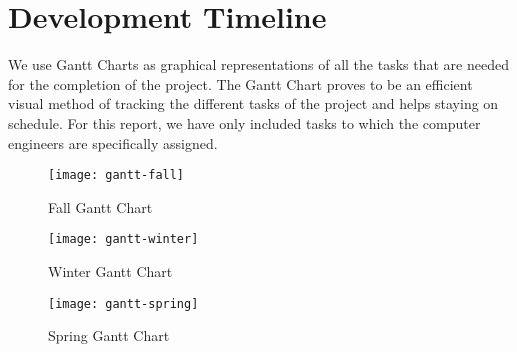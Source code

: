 \section {Development Timeline}

	We use Gantt Charts as graphical representations of all the tasks that are needed for the completion of the project. The Gantt Chart proves to be an efficient visual method of tracking the different tasks of the project and helps staying on schedule. For this report, we have only included tasks to which the computer engineers are specifically assigned.

\begin{figure}[H]
\texttt{[image: gantt-fall]}
\caption{\label{figure:gantt-fall} Fall Gantt Chart}
\end{figure}

\begin{figure}[H]
\texttt{[image: gantt-winter]}
\caption{\label{figure:gantt-winter} Winter Gantt Chart}
\end{figure}


\begin{figure}[H]
\texttt{[image: gantt-spring]}
\caption{\label{figure:gantt-spring} Spring Gantt Chart}
\end{figure}